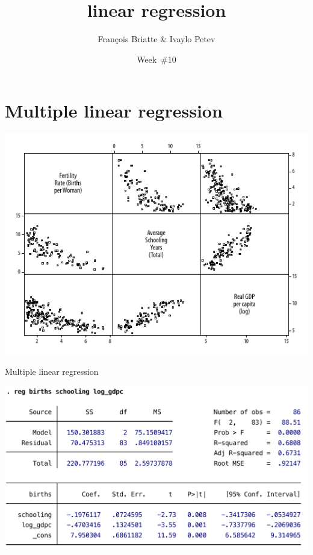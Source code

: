 \documentclass[t]{beamer}
\title{linear regression}
\author{François Briatte \& Ivaylo Petev}
\date{Week~\#10}
\begin{document}
    

    \frame[plain]{
        \titlepage\\[7em]
        \tableofcontents[hideallsubsections]
        }

    

    \section{Multiple linear regression}

	\begin{frame}[c]%
			
		\begin{center}
			\includegraphics[width=\textwidth]{mreg-gr-mat.pdf}
		\end{center}
				
	\end{frame}
	
	\begin{frame}[c]{Multiple linear regression} %
			
		\begin{center}
			\includegraphics[width=\textwidth]{mreg-output.pdf}
		\end{center}
				
	\end{frame}	
	
\end{document}
